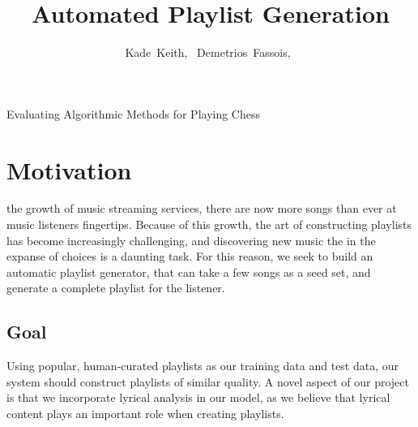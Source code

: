 \documentclass[10pt,journal,compsoc]{IEEEtran}
\begin{document}
\title{Automated Playlist Generation\\}

\author{
  Kade~Keith,~
  Demetrios~Fassois,~
}

%
{Evaluating Algorithmic Methods for Playing Chess}


\maketitle

\section{Motivation}

 the growth of music streaming services, there are now more songs than ever at music listeners fingertips. Because of this growth, the art of constructing playlists has become increasingly challenging, and discovering new music the in the expanse of choices is a daunting task. For this reason, we seek to build an automatic playlist generator, that can take a few songs as a seed set, and generate a complete playlist for the listener.

\subsection{Goal}
Using popular, human-curated playlists as our training data and test data, our system should construct playlists of similar quality. A novel aspect of our project is that we incorporate lyrical analysis in our model, as we believe that lyrical content plays an important role when creating playlists.
\end{document}
